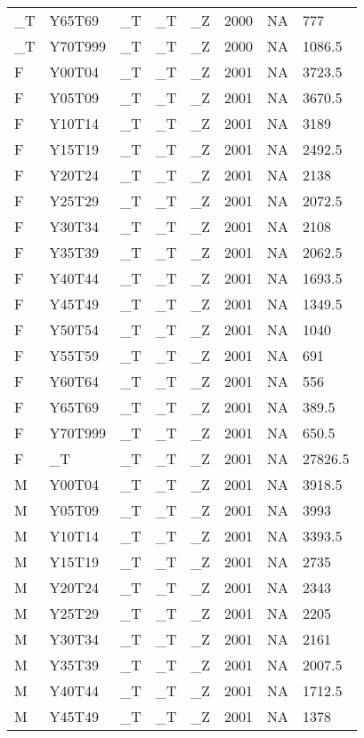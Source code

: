 \begin{longtable}[t]{llllllll}
\_T & Y65T69 & \_T & \_T & \_Z & 2000 & NA & 777\\
\_T & Y70T999 & \_T & \_T & \_Z & 2000 & NA & 1086.5\\
\addlinespace
F & Y00T04 & \_T & \_T & \_Z & 2001 & NA & 3723.5\\
F & Y05T09 & \_T & \_T & \_Z & 2001 & NA & 3670.5\\
F & Y10T14 & \_T & \_T & \_Z & 2001 & NA & 3189\\
F & Y15T19 & \_T & \_T & \_Z & 2001 & NA & 2492.5\\
F & Y20T24 & \_T & \_T & \_Z & 2001 & NA & 2138\\
\addlinespace
F & Y25T29 & \_T & \_T & \_Z & 2001 & NA & 2072.5\\
F & Y30T34 & \_T & \_T & \_Z & 2001 & NA & 2108\\
F & Y35T39 & \_T & \_T & \_Z & 2001 & NA & 2062.5\\
F & Y40T44 & \_T & \_T & \_Z & 2001 & NA & 1693.5\\
F & Y45T49 & \_T & \_T & \_Z & 2001 & NA & 1349.5\\
\addlinespace
F & Y50T54 & \_T & \_T & \_Z & 2001 & NA & 1040\\
F & Y55T59 & \_T & \_T & \_Z & 2001 & NA & 691\\
F & Y60T64 & \_T & \_T & \_Z & 2001 & NA & 556\\
F & Y65T69 & \_T & \_T & \_Z & 2001 & NA & 389.5\\
F & Y70T999 & \_T & \_T & \_Z & 2001 & NA & 650.5\\
\addlinespace
F & \_T & \_T & \_T & \_Z & 2001 & NA & 27826.5\\
M & Y00T04 & \_T & \_T & \_Z & 2001 & NA & 3918.5\\
M & Y05T09 & \_T & \_T & \_Z & 2001 & NA & 3993\\
M & Y10T14 & \_T & \_T & \_Z & 2001 & NA & 3393.5\\
M & Y15T19 & \_T & \_T & \_Z & 2001 & NA & 2735\\
\addlinespace
M & Y20T24 & \_T & \_T & \_Z & 2001 & NA & 2343\\
M & Y25T29 & \_T & \_T & \_Z & 2001 & NA & 2205\\
M & Y30T34 & \_T & \_T & \_Z & 2001 & NA & 2161\\
M & Y35T39 & \_T & \_T & \_Z & 2001 & NA & 2007.5\\
M & Y40T44 & \_T & \_T & \_Z & 2001 & NA & 1712.5\\
\addlinespace
M & Y45T49 & \_T & \_T & \_Z & 2001 & NA & 1378\\

\end{longtable}
